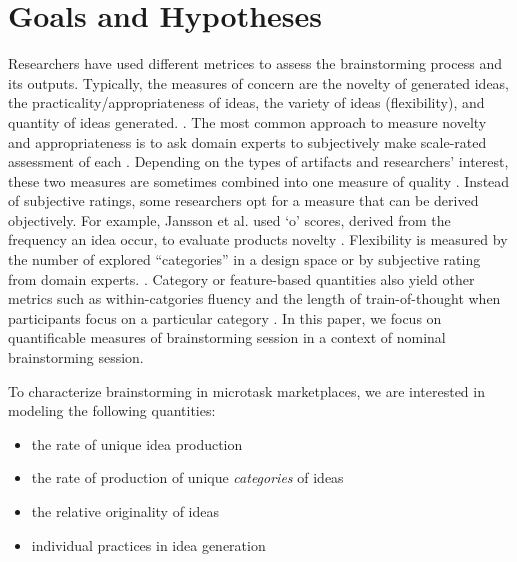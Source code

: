 \section{Goals and Hypotheses}

Researchers have used different metrices to assess the brainstorming process and its outputs. Typically, the measures of concern are the novelty of generated ideas, the practicality/appropriateness of ideas, the variety of ideas (flexibility), and quantity of ideas generated. \cite{finke1992creative, shah2003metrics}. The most common approach to measure novelty and appropriateness is to ask domain experts to subjectively make scale-rated assessment of each \cite{lewis2011affective, amabile_1983}. Depending on the types of artifacts and researchers' interest, these two measures are sometimes combined into one measure of quality \cite{little2010exploring}. Instead of subjective ratings, some researchers opt for a measure that can be derived objectively. For example, Jansson et al. used `o' scores, derived from the frequency an idea occur, to evaluate products novelty \cite{jansson_design_1991}. Flexibility is measured by the number of explored ``categories'' in a design space or by subjective rating from domain experts. \cite{lewis2011affective, marsh1996examples}. Category or feature-based quantities also yield other metrics such as within-catgories fluency and  the length of train-of-thought when participants focus on a particular category \cite{nijstad_how_2006}. In this paper, we focus on quantificable measures of brainstorming session in a context of nominal brainstorming session.


To characterize brainstorming in microtask marketplaces, we are interested in modeling the following quantities:
\begin{itemize}
\item the rate of unique idea production
\item the rate of production of unique \emph{categories} of ideas
\item the relative originality of ideas
\item individual practices in idea generation
\end{itemize}

